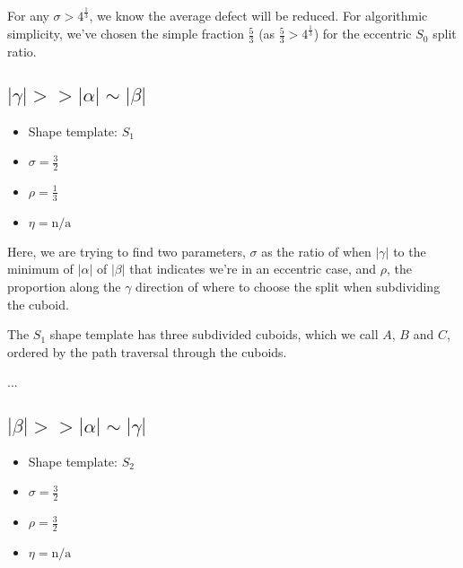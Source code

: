 For any $\sigma > 4^{\frac{1}{3}}$, we know the average defect will be reduced.
For algorithmic simplicity, we've chosen the simple fraction $\frac{5}{3}$ (as $\frac{5}{3} > 4^{\frac{1}{3}}$)
for the eccentric $S_0$ split ratio.

\subsection{$|\gamma| >> |\alpha| \sim |\beta|$}

\begin{itemize}
  \item Shape template: $S_1$
  \item $\sigma = \frac{3}{2}$
  \item $\rho = \frac{1}{3}$
  \item $\eta= \text{n/a}$
\end{itemize}

Here, we are trying to find two parameters, $\sigma$ as the ratio of when $|\gamma|$ to the minimum
of $|\alpha|$ of $|\beta|$ that indicates we're in an eccentric case, and $\rho$,
the proportion along the $\gamma$ direction of where to choose the split when subdividing the cuboid.

The $S_1$ shape template has three subdivided cuboids, which we call $A$, $B$ and $C$, ordered by
the path traversal through the cuboids.

...





\subsection{$|\beta| >> |\alpha| \sim |\gamma|$}

\begin{itemize}
  \item Shape template: $S_2$
  \item $\sigma = \frac{3}{2}$
  \item $\rho = \frac{3}{2}$
  \item $\eta= \text{n/a}$
\end{itemize}



